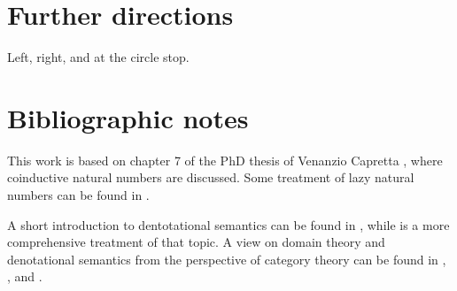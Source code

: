 \documentclass[a4paper]{article}
\begin{document}
\section{Further directions}

Left, right, and at the circle stop.

\section{Bibliographic notes}

This work is based on chapter 7 of the PhD thesis of Venanzio Capretta
\cite{Capretta2002}, where coinductive natural numbers are discussed.  Some
treatment of lazy natural numbers can be found in \cite{Escardo1993}.

A short introduction to dentotational semantics can be found in
\cite{Allison1986}, while \cite{Gunter1992} is a more comprehensive treatment of
that topic.  A view on domain theory and denotational semantics from the
perspective of category theory can be found in \cite{Pierce1991},
\cite{Bird1997}, \cite{Mitchell1996} and \cite{BarrWells1990}.




\end{document}

